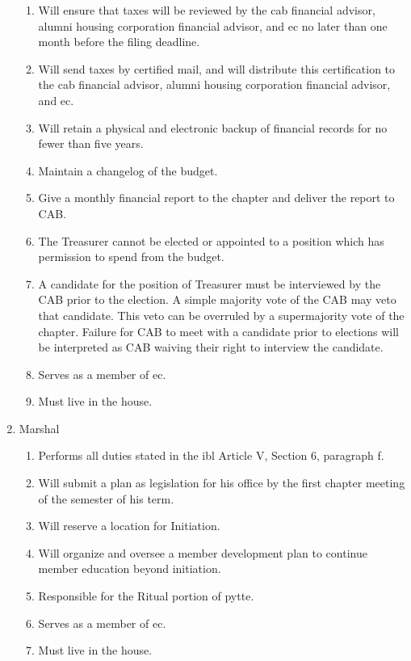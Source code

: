\begin{enumerate}
\begin{enumerate}
				\item Will ensure that taxes will be reviewed by the \gls{cab} financial advisor, alumni housing corporation financial advisor, and \gls{ec} no later than one month before the filing deadline.
				\item Will send taxes by certified mail, and will distribute this certification to the \gls{cab} financial advisor, alumni housing corporation financial advisor, and \gls{ec}.
				\item Will retain a physical and electronic backup of financial records for no fewer than five years.
                \item Maintain a changelog of the budget.
                \item Give a monthly financial report to the chapter and deliver the report to CAB.
                \item The Treasurer cannot be elected or appointed to a position which has permission
to spend from the budget.
				\item A candidate for the position of Treasurer must be interviewed by the CAB prior to the
election. A simple majority vote of the CAB may veto that candidate. This veto can be overruled
by a supermajority vote of the chapter. Failure for CAB to meet with a candidate prior to
elections will be interpreted as CAB waiving their right to interview the candidate.
				\item Serves as a member of \gls{ec}.
				\item Must live in the house.
			\end{enumerate}
		
		\item Marshal
			\begin{enumerate}
				\item Performs all duties stated in the \gls{ibl} Article V, Section 6, paragraph f.
				\item Will submit a plan as legislation for his office by the first chapter meeting of the semester of his term.
				\item Will reserve a location for Initiation.
                \item Will organize and oversee a member development plan to continue member education beyond initiation.
				\item Responsible for the Ritual portion of \gls{pytte}.
				\item Serves as a member of \gls{ec}.
				\item Must live in the house.
			\end{enumerate}


\end{enumerate}
